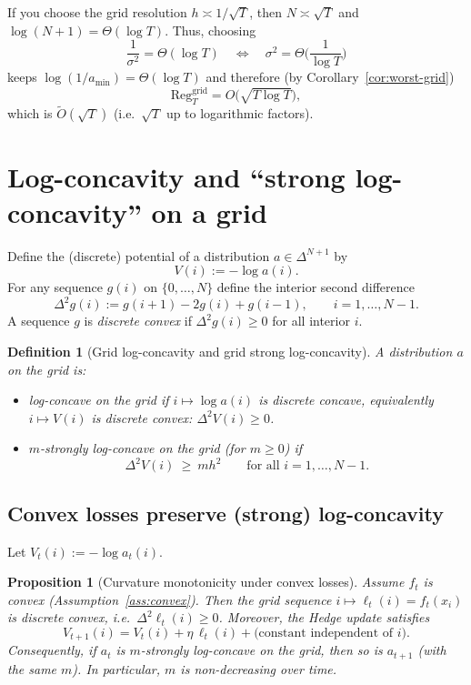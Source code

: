 \documentclass[11pt]{article}
\newtheorem{proposition}{Proposition}
\newtheorem{definition}{Definition}
\begin{document}
If you choose the grid resolution $h\asymp 1/\sqrt{T}$, then $N\asymp \sqrt{T}$ and $\log(N+1)=\Theta(\log T)$.
Thus, choosing
\begin{equation}\label{eq:sigma-choice}
    \frac{1}{\sigma^2} = \Theta(\log T)
    \quad\Longleftrightarrow\quad
    \sigma^2 = \Theta\!\Big(\frac{1}{\log T}\Big)
\end{equation}
keeps $\log(1/a_{\min})=\Theta(\log T)$ and therefore (by Corollary~\ref{cor:worst-grid})
\[
    \mathrm{Reg}^{\mathrm{grid}}_T = O\!\big(\sqrt{T\log T}\big),
\]
which is $\widetilde{O}(\sqrt{T})$ (i.e.\ $\sqrt{T}$ up to logarithmic factors).

\section{Log-concavity and ``strong log-concavity'' on a grid}

Define the (discrete) potential of a distribution $a\in\Delta^{N+1}$ by
\[
    V(i) := -\log a(i).
\]
For any sequence $g(i)$ on $\{0,\dots,N\}$ define the interior second difference
\[
    \Delta^2 g(i) := g(i+1)-2g(i)+g(i-1),\qquad i=1,\dots,N-1.
\]
A sequence $g$ is \emph{discrete convex} if $\Delta^2 g(i)\ge 0$ for all interior $i$.

\begin{definition}[Grid log-concavity and grid strong log-concavity]\label{def:slc}
    A distribution $a$ on the grid is:
    \begin{itemize}
        \item \emph{log-concave on the grid} if $i\mapsto \log a(i)$ is discrete concave, equivalently $i\mapsto V(i)$ is discrete convex: $\Delta^2 V(i)\ge 0$.
        \item \emph{$m$-strongly log-concave on the grid} (for $m\ge 0$) if
              \[
                  \Delta^2 V(i) \ \ge\ m h^2\qquad \text{for all } i=1,\dots,N-1.
              \]
    \end{itemize}
\end{definition}

\subsection{Convex losses preserve (strong) log-concavity}
Let $V_t(i):=-\log a_t(i)$.

\begin{proposition}[Curvature monotonicity under convex losses]\label{prop:kappa-mono}
    Assume $f_t$ is convex (Assumption~\ref{ass:convex}). Then the grid sequence $i\mapsto \ell_t(i)=f_t(x_i)$ is discrete convex, i.e.\ $\Delta^2 \ell_t(i)\ge 0$.
    Moreover, the Hedge update satisfies
    \[
        V_{t+1}(i) = V_t(i) + \eta\,\ell_t(i) + \text{(constant independent of $i$)}.
    \]
    Consequently, if $a_t$ is $m$-strongly log-concave on the grid, then so is $a_{t+1}$ (with the same $m$). In particular, $m$ is non-decreasing over time.
\end{proposition}
\end{document}
